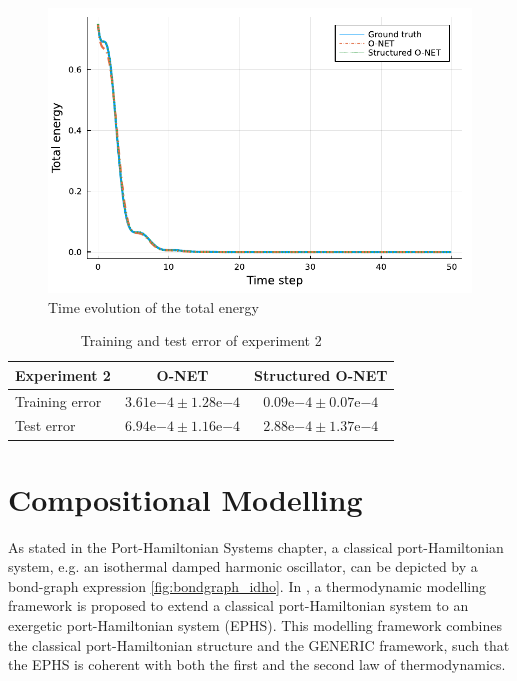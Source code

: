 \documentclass[
	parskip, 			   %
	twoside, 			   %
	DIV=14, 			   %
	BCOR=15.0mm, 		   %
	headsepline, 		   %
	open=right, 		   %
	captions=tableheading, %
	bibliography=totoc,    %
	numbers=noenddot       %
]{scrreprt}
\begin{document}
\begin{figure}[h!]
    \centering
    \includegraphics[scale=1]{figures/Hamiltonian_structured_O_NET_idho.pdf}
    \caption{Time evolution of the total energy}
    \label{fig:Hamiltonian_error_structured_O_NET_idho}
\end{figure}

\begin{table}[h!]
	\centering
	\caption{Training and test error of experiment 2}
	\label{tab:error_experiment2}
	\begin{tabularx}{\textwidth}{lcc}
		\toprule
		\textbf{Experiment 2} & \textbf{O-NET} & \textbf{Structured O-NET}\\
		\midrule
		Training error & $3.61\mathrm{e}{-4} \pm 1.28\mathrm{e}{-4}$ & $0.09\mathrm{e}{-4} \pm 0.07\mathrm{e}{-4}$ \\
		Test error & $6.94\mathrm{e}{-4} \pm 1.16\mathrm{e}{-4}$ & $2.88\mathrm{e}{-4} \pm 1.37\mathrm{e}{-4}$ \\
		\bottomrule
	\end{tabularx}
\end{table}

\clearpage
\chapter{Compositional Modelling}
\label{ch:chapter7}

As stated in the Port-Hamiltonian Systems chapter, a classical port-Hamiltonian system, e.g. an isothermal damped harmonic oscillator, can be depicted by a bond-graph expression \ref{fig:bondgraph_idho}. In \cite{lohmayer2021exergetic}, a thermodynamic modelling framework is proposed to extend a classical port-Hamiltonian system to an exergetic port-Hamiltonian system (EPHS). This modelling framework combines the classical port-Hamiltonian structure and the GENERIC framework, such that the EPHS is coherent with both the first and the second law of thermodynamics.
\end{document}
